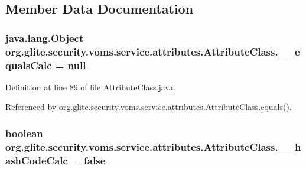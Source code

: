 \subsection{Member Data Documentation}
\hypertarget{classorg_1_1glite_1_1security_1_1voms_1_1service_1_1attributes_1_1AttributeClass_ad1e5727edef511b4396776dc1bc4ee16}{
\subsubsection[{\_\-\_\-equalsCalc}]{\setlength{\rightskip}{0pt plus 5cm}java.lang.Object {\bf org.glite.security.voms.service.attributes.AttributeClass.\_\-\_\-equalsCalc} = null}}
\label{classorg_1_1glite_1_1security_1_1voms_1_1service_1_1attributes_1_1AttributeClass_ad1e5727edef511b4396776dc1bc4ee16}


Definition at line 89 of file AttributeClass.java.



Referenced by org.glite.security.voms.service.attributes.AttributeClass.equals().

\hypertarget{classorg_1_1glite_1_1security_1_1voms_1_1service_1_1attributes_1_1AttributeClass_a192486574f7af02630f61d253260c895}{
\subsubsection[{\_\-\_\-hashCodeCalc}]{\setlength{\rightskip}{0pt plus 5cm}boolean {\bf org.glite.security.voms.service.attributes.AttributeClass.\_\-\_\-hashCodeCalc} = false}}
\label{classorg_1_1glite_1_1security_1_1voms_1_1service_1_1attributes_1_1AttributeClass_a192486574f7af02630f61d253260c895}


